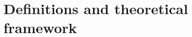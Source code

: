\documentclass[preprint,12pt]{elsarticle}
\begin{document}


\section{Definitions and theoretical framework}\label{defini}
\end{document}
